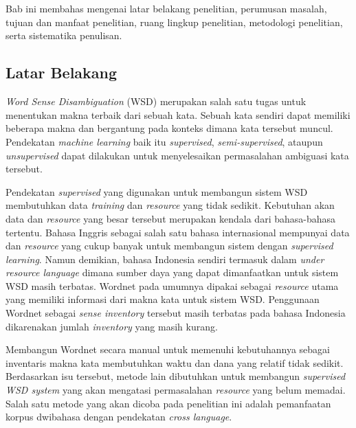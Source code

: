 \chapter{\babSatu}
Bab ini membahas mengenai latar belakang penelitian, perumusan masalah, tujuan dan manfaat penelitian, ruang lingkup penelitian, metodologi penelitian, serta sistematika penulisan.

\section{Latar Belakang}

\textit{Word Sense Disambiguation} (WSD) merupakan salah satu tugas untuk menentukan makna terbaik dari sebuah kata. Sebuah kata sendiri dapat memiliki beberapa makna dan bergantung pada konteks dimana kata tersebut muncul. Pendekatan \textit{machine learning} baik itu \textit{supervised}, \textit{semi-supervised}, ataupun \textit{unsupervised} dapat dilakukan untuk menyelesaikan permasalahan ambiguasi kata tersebut.

Pendekatan \textit{supervised} yang digunakan untuk membangun sistem WSD membutuhkan data \textit{training} dan \textit{resource} yang tidak sedikit. Kebutuhan akan data dan \textit{resource} yang besar tersebut merupakan kendala dari bahasa-bahasa tertentu. Bahasa Inggris sebagai salah satu bahasa internasional mempunyai data dan \textit{resource} yang cukup banyak untuk membangun sistem dengan \textit{supervised learning}. Namun demikian, bahasa Indonesia sendiri termasuk dalam \textit{under resource language} dimana sumber daya yang dapat dimanfaatkan untuk sistem WSD masih terbatas. Wordnet pada umumnya dipakai sebagai \textit{resource} utama yang memiliki informasi dari makna kata untuk sistem WSD. Penggunaan Wordnet sebagai \textit{sense inventory} tersebut masih terbatas pada bahasa Indonesia dikarenakan jumlah \textit{inventory} yang masih kurang.

Membangun Wordnet secara manual untuk memenuhi kebutuhannya sebagai inventaris makna kata membutuhkan waktu dan dana yang relatif tidak sedikit. Berdasarkan isu tersebut, metode lain dibutuhkan untuk membangun \textit{supervised WSD system} yang akan mengatasi permasalahan \textit{resource} yang belum memadai. Salah satu metode yang akan dicoba pada penelitian ini adalah pemanfaatan korpus dwibahasa dengan pendekatan \textit{cross language}.

